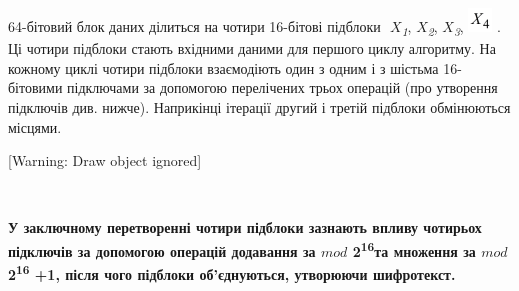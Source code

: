 {{{{{{{{{{{{{{{{{{\begin{definition}
{{{{{{{{{ 64-бітовий блок даних ділиться на чотири 16-бітові підблоки  $ $
$X$\textit{\textsubscript{1}}, $X$\textit{\textsubscript{2}},
$X$\textit{\textsubscript{3}}, 
\includegraphics[width=0.25in,height=0.25in]{crypt-img/crypt-img301.png} . Ці
чотири підблоки стають вхідними даними для першого циклу алгоритму. На кожному
циклі чотири підблоки взаємодіють один з одним і з шістьма 16-бітовими 
підключами за допомогою перелічених трьох операцій (про утворення підключів
див. нижче).  Наприкінці ітерації  другий  і третій підблоки обмінюються 
місцями. 


\bigskip

[Warning: Draw object ignored]


\bigskip


\bigskip


\bigskip


\bigskip


\bigskip


\bigskip


\bigskip


\bigskip


\bigskip


\bigskip


\bigskip


\bigskip


\bigskip


\bigskip


\bigskip


\bigskip


\bigskip


\bigskip


\bigskip


\bigskip


\bigskip



\begin{figure}
\centering
\begin{minipage}{}
$$
\end{minipage}
\end{figure}

\bigskip

{\bfseries
\textmd{У заключному перетворенні  чотири підблоки зазнають впливу чотирьох
підключів за допомогою операцій }\textmd{додавання за
}\textmd{$mod$}\textmd{\textit{
}}\textmd{2}\textmd{\textsuperscript{16}}\textmd{та
}\textmd{множення за }\textmd{$mod$}\textmd{
}\textmd{2}\textmd{\textsuperscript{16}}\textmd{ +1, після чого підблоки
об'єднуються, утворюючи шифротекст.}}

}}}}}}}}}
\end{definition}}}}}}}}}}}}}}}}}}}
